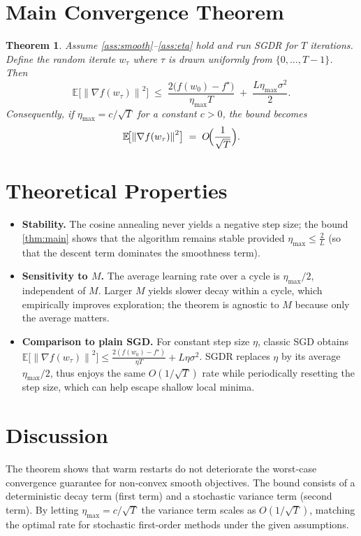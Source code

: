 \documentclass{article}
\newtheorem{theorem}{Theorem}
\newcommand{\EE}{\mathbb{E}}
\newcommand{\norm}[1]{\left\|#1\right\|}
\begin{document}
\section*{Main Convergence Theorem}
\begin{theorem}\label{thm:main}
Assume \ref{ass:smooth}–\ref{ass:eta} hold and run SGDR for $T$ iterations.  
Define the random iterate $w_{\tau}$ where $\tau$ is drawn uniformly from $\{0,\dots,T-1\}$. Then
\[
\EE\!\bigl[\norm{\nabla f(w_{\tau})}^{2}\bigr]
\;\le\;
\frac{2\bigl(f(w_{0})-f^{\star}\bigr)}{\eta_{\max}T}
\;+\;
\frac{L\eta_{\max}\sigma^{2}}{2}.
\tag{1}
\]
Consequently, if $\eta_{\max}=c/\sqrt{T}$ for a constant $c>0$, the bound becomes
\[
\EE\!\bigl[\norm{\nabla f(w_{\tau})}^{2}\bigr]
\;=\;O\!\Bigl(\frac{1}{\sqrt{T}}\Bigr).
\]
\end{theorem}

\section*{Theoretical Properties}
\begin{itemize}[leftmargin=*]
\item \textbf{Stability.} The cosine annealing never yields a negative step size; the bound \eqref{thm:main} shows that the algorithm remains stable provided $\eta_{\max}\le \frac{2}{L}$ (so that the descent term dominates the smoothness term).
\item \textbf{Sensitivity to $M$.} The average learning rate over a cycle is $\eta_{\max}/2$, independent of $M$. Larger $M$ yields slower decay within a cycle, which empirically improves exploration; the theorem is agnostic to $M$ because only the average matters.
\item \textbf{Comparison to plain SGD.} For constant step size $\eta$, classic SGD obtains $\EE\!\bigl[\norm{\nabla f(w_{\tau})}^{2}\bigr]\le\frac{2(f(w_{0})-f^{\star})}{\eta T}+L\eta\sigma^{2}$. SGDR replaces $\eta$ by its average $\eta_{\max}/2$, thus enjoys the same $O(1/\sqrt{T})$ rate while periodically resetting the step size, which can help escape shallow local minima.
\end{itemize}

\section*{Discussion}
The theorem shows that warm restarts do not deteriorate the worst‑case convergence guarantee for non‑convex smooth objectives. The bound consists of a deterministic decay term (first term) and a stochastic variance term (second term). By letting $\eta_{\max}=c/\sqrt{T}$ the variance term scales as $O(1/\sqrt{T})$, matching the optimal rate for stochastic first‑order methods under the given assumptions.
\end{document}
